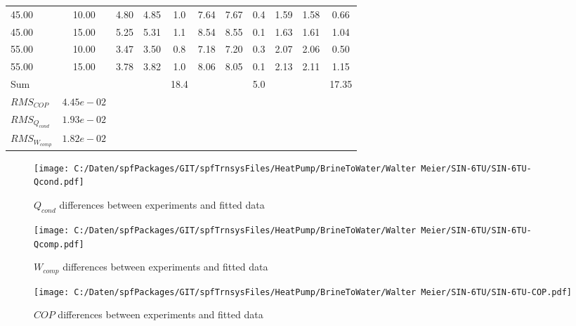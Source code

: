 \documentclass[english]{SPFShortReport}
\begin{document}
\begin{table}[!ht]
\begin{small}
\begin{center}
{\begin{tabular}{l | c c c c c c c c c c }
45.00  & 10.00 & 4.80 & 4.85 & 1.0 & 7.64 & 7.67 & 0.4 & 1.59 & 1.58 & 0.66\\ 
45.00  & 15.00 & 5.25 & 5.31 & 1.1 & 8.54 & 8.55 & 0.1 & 1.63 & 1.61 & 1.04\\ 
55.00  & 10.00 & 3.47 & 3.50 & 0.8 & 7.18 & 7.20 & 0.3 & 2.07 & 2.06 & 0.50\\ 
55.00  & 15.00 & 3.78 & 3.82 & 1.0 & 8.06 & 8.05 & 0.1 & 2.13 & 2.11 & 1.15\\ 
\hline 
 Sum &  & &  & 18.4 &  &  & 5.0 & &  & 17.35\\ 
\hline 
 $RMS_{COP}$ & $4.45e-02$ \\ 
 $RMS_{Q_{cond}}$ & $1.93e-02$ \\ 
 $RMS_{W_{comp}}$ & $1.82e-02$ \\ 
\hline
\hline
\end{tabular}
}
\label{ErrorsTable}
\end{center}
\end{small}
\end{table}
\begin{figure}[!ht]
\begin{center}
\texttt{[image: C:/Daten/spfPackages/GIT/spfTrnsysFiles/HeatPump/BrineToWater/Walter Meier/SIN-6TU/SIN-6TU-Qcond.pdf]}
\caption{$Q_{cond}$ differences between experiments and fitted data}
\label{QcongFig}
\end{center}
\end{figure}
\begin{figure}[!ht]
\begin{center}
\texttt{[image: C:/Daten/spfPackages/GIT/spfTrnsysFiles/HeatPump/BrineToWater/Walter Meier/SIN-6TU/SIN-6TU-Qcomp.pdf]}
\caption{$W_{comp}$ differences between experiments and fitted data}
\label{QcompFig}
\end{center}
\end{figure}
\begin{figure}[!ht]
\begin{center}
\texttt{[image: C:/Daten/spfPackages/GIT/spfTrnsysFiles/HeatPump/BrineToWater/Walter Meier/SIN-6TU/SIN-6TU-COP.pdf]}
\caption{$COP$ differences between experiments and fitted data}
\label{COPFig}
\end{center}
\end{figure}
\end{document}

